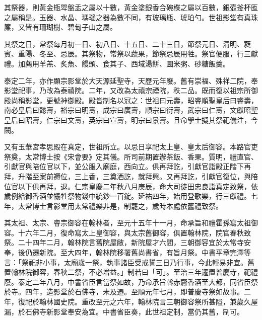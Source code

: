 \begin{pinyinscope}
 其祭器，則黃金瓶斝盤盂之屬以十數，黃金塗銀香合碗楪之屬以百數，銀壺釜杯匜之屬稱是。玉器、水晶、瑪瑙之器為數不同，有玻璃瓶、琥珀勺。世祖影堂有真珠簾，又皆有珊瑚樹、碧甸子山之屬。



 其祭之日，常祭每月初一日、初八日、十五日、二十三日，節祭元日、清明、蕤賓、重陽、冬至、忌辰。其祭物，常祭以蔬果，節祭忌辰用牲。祭官便服，行三獻禮。加薦用羊羔、炙魚、饅頭、食其子、西域湯餅、圜米粥、砂糖飯羹。



 泰定二年，亦作顯宗影堂於大天源延聖寺，天歷元年廢。舊有崇福、殊祥二院，奉影堂祀事，乃改為泰禧院。二年，又改為太禧宗禋院，秩二品。既而復以祖宗所御殿尚稱影堂，更號神御殿。殿皆制名以冠之：世祖曰元壽，昭睿順聖皇后曰睿壽，南必皇后曰懿壽，裕宗曰明壽，成宗曰廣壽，順宗曰衍壽，武宗曰仁壽，文獻昭聖皇后曰昭壽，仁宗曰文壽，英宗曰宣壽，明宗曰景壽。且命學士擬其祭祀儀注，今闕。



 又有玉華宮孝思殿在真定，世祖所立。以忌日享祀太上皇、皇太后御容。本路官吏祭奠，太常博士按《宋會要》定其儀。所司前期置辦茶飯、香果。質明，禮直官、引獻官與陪位官以下，並公服入廟庭，西向立。俱再拜訖，引獻官詣殿正階下再拜，升階至案前褥位，三上香，三奠酒訖，就拜興。又再拜訖，引獻官復位，與陪位官以下俱再拜，退。仁宗皇慶二年秋八月庚辰，命大司徒田忠良詣真定致祭，依歲例給御香酒並犧牲祭物錢中統鈔一百錠。延祐四年，始用登歌樂，行三獻禮。七年，太常博士言影堂用太常禮樂非是，制罷之，歲時本處依舊禮致祭。



 其太祖、太宗、睿宗御容在翰林者，至元十五年十一月，命承旨和禮霍孫寫太祖御容。十六年二月，復命寫太上皇御容，與太宗舊御容，俱置翰林院，院官春秋致祭。二十四年二月，翰林院言舊院屋敝，新院屋才六間，三朝御容宜於太常寺安奉，後仍遷新院。至大四年，翰林院移署舊尚書省，有旨月祭。中書平章完澤等言：「祭祀非小事，太廟歲一祭，執事諸臣受戒誓三日乃行事，今此輕易非宜。舊置翰林院御容，春秋二祭，不必增益。」制若曰「可」。至治三年遷置普慶寺，祀禮廢。泰定二年八月，中書省臣言當祭如故，乃命承旨斡赤齎香酒至大都，同省臣祭於寺。四年，造影堂於石佛寺，未及遷。至順元年七月，即普慶寺祭如故事。二年，復祀於翰林國史院。重改至元之六年，翰林院言三朝御容祭所甚隘，兼歲久屋漏，於石佛寺新影堂奉安為宜。中書省臣奏，此世祖定制，當仍其舊，制可。



\end{pinyinscope}